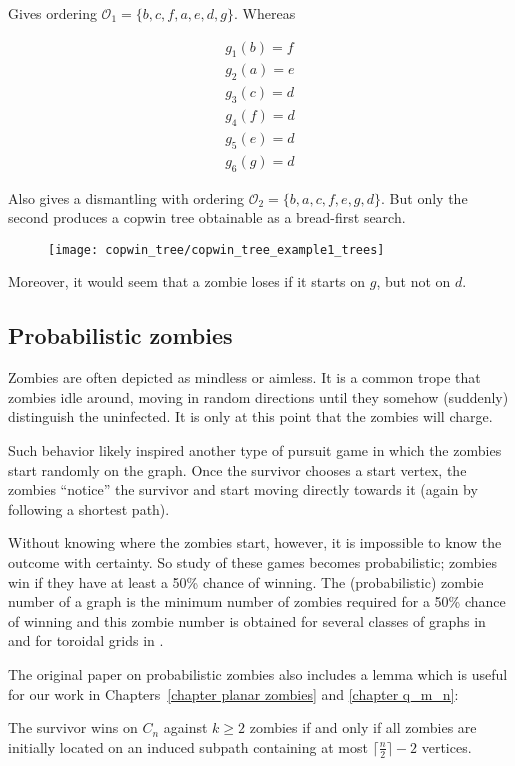 Gives ordering $\mathcal{O}_1 = \{ b, c, f, a, e, d, g \}$. Whereas

\begin{align*}
  g_1(b) = f \\
  g_2(a) = e \\
  g_3(c) = d \\
  g_4(f) = d \\
  g_5(e) = d \\
  g_6(g) = d
\end{align*}

Also gives a dismantling with ordering $\mathcal{O}_2 = \{b, a, c, f, e, g, d \}$.
But only the second produces a copwin tree obtainable as a bread-first search.

\begin{figure}[h!]
\centering
\texttt{[image: copwin\_tree/copwin\_tree\_example1\_trees]}
\end{figure}

Moreover, it would seem that a zombie loses if it starts on $g$, but not on $d$.


\subsection{Probabilistic zombies}

Zombies are often depicted as mindless or aimless. It is a common trope that zombies
idle around, moving in random directions until they somehow (suddenly) distinguish
the uninfected. It is only at this point that the zombies will charge.

Such behavior likely inspired another type of pursuit game \cite{bonato2016probabilistic} in which the zombies start randomly on
the graph. Once the survivor chooses a start vertex, the zombies ``notice'' the survivor and start
moving directly towards it (again by following a shortest path).

Without knowing where the zombies start, however, it is impossible to know the outcome with certainty.
So study of these games becomes probabilistic; zombies win if they have at least a 50\% chance of winning.
The (probabilistic) zombie number of a graph is the minimum number of zombies required for a 50\% chance of winning and this zombie number is
obtained for several classes of graphs in \cite{bonato2016probabilistic} and for
toroidal grids in \cite{pralat2019many}.

The original paper on probabilistic zombies \cite{bonato2016probabilistic} also includes a lemma which is useful for our work
in Chapters~\ref{chapter planar zombies} and \ref{chapter q_m_n}:

\begin{lemma} The survivor wins on $C_n$ against $k \geq 2$ zombies if and only if all zombies are initially located on an induced subpath
containing at most $\lceil\frac{n}{2}\rceil-2$ vertices.
\end{lemma}
